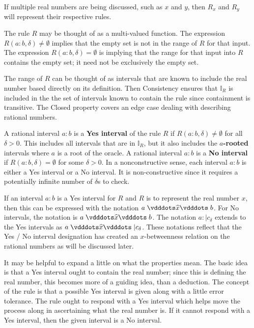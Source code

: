 \documentclass[12pt]{article}
\begin{document}
If multiple real numbers are being discussed, such as $x$ and $y$, then $R_x$ and $R_y$ will represent their respective rules. 

The rule $R$ may be thought of as a multi-valued function. The expression $R(a:b, \delta) \neq \emptyset$ implies that the empty set is not in the range of $R$ for that input. The expression $R(a:b, \delta) = \emptyset$ is implying that the range for that input into $R$ contains the empty set; it need not be exclusively the empty set. 

The range of $R$ can be thought of as intervals that are known to include the real number based directly on its definition. Then Consistency ensures that $\mathbb{I}_R$ is included in the the set of intervals known to contain the rule since containment is transitive. The Closed property covers an edge case dealing with describing rational numbers.

A rational interval $a:b$ is a \textbf{Yes interval} of the rule $R$ if $R(a:b, \delta) \neq \emptyset$ for all $\delta >0$. This includes all intervals that are in  $\mathbb{I}_R$, but it also includes the \textbf{$a$-rooted} intervals where $a$ is a root of the oracle.   A rational interval $a:b$ is a \textbf{No interval} if $R(a:b, \delta) = \emptyset$ for some $\delta > 0$. In a nonconstructive sense, each interval $a:b$ is either a Yes interval or a No interval. It is non-constructive since it requires a potentially infinite number of $\delta$s to check. 

If an interval $a:b$ is a Yes interval for $R$ and $R$ is to represent the real number $x$, then this can be expressed with the notation $a \xora b$. For No intervals, the notation is \sout{$a \xora b$}. The notation $a:|c_\delta$ extends to the Yes intervals as $a \xora |c_\delta$. These notations reflect that the Yes / No interval designation has created an $x$-betweenness relation on the rational numbers as will be discussed later.

It may be helpful to expand a little on what the properties mean. The basic idea is that a Yes interval ought to contain the real number; since this is defining the real number, this becomes more of a guiding idea, than a deduction. The concept of the rule is that a possible Yes interval is given along with a little error tolerance. The rule ought to respond with a Yes interval which helps move the process along in ascertaining what the real number is. If it cannot respond with a Yes interval, then the given interval is a No interval. 
\end{document}
